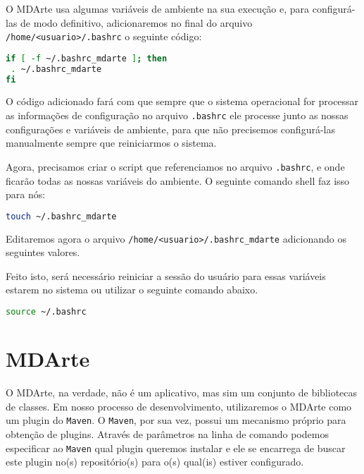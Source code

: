 O MDArte usa algumas variáveis de ambiente na sua execução e, para configurá-las
de modo definitivo, adicionaremos no final do arquivo
\texttt{/home/<usuario>/.bashrc} o seguinte código:

\begin{lstlisting}[language=bash]
if [ -f ~/.bashrc_mdarte ]; then
 . ~/.bashrc_mdarte
fi
\end{lstlisting}

O código adicionado fará com que sempre que o sistema operacional for processar
as informações de configuração no arquivo \texttt{.bashrc} ele processe junto
as nossas configurações e variáveis de ambiente, para que não precisemos
configurá-las manualmente sempre que reiniciarmos o sistema. 

Agora, precisamos criar o script que referenciamos no arquivo
\texttt{.bashrc}, e onde ficarão todas as nossas variáveis do ambiente. O
seguinte comando shell faz isso para nós:

\begin{lstlisting}[language=bash]
touch ~/.bashrc_mdarte
\end{lstlisting}
	
Editaremos agora o arquivo \texttt{/home/<usuario>/.bashrc\_mdarte} adicionando
os seguintes valores.

\begin{framed}
	
\end{framed}

Feito isto, será necessário reiniciar a sessão do usuário para essas variáveis
estarem no sistema ou utilizar o seguinte comando abaixo.

\begin{lstlisting}[language=bash]
source ~/.bashrc
\end{lstlisting}

\section{MDArte}

O MDArte, na verdade, não é um aplicativo, mas sim um conjunto de bibliotecas de
classes. Em nosso processo de desenvolvimento, utilizaremos o MDArte como um
plugin do \texttt{Maven}. O \texttt{Maven}, por sua vez, possui um mecanismo
próprio para obtenção de plugins. Através de parâmetros na linha de comando
podemos especificar ao \texttt{Maven} qual plugin queremos instalar e ele se
encarrega de buscar este plugin no(s) repositório(s) para o(s) qual(is) estiver
configurado.

